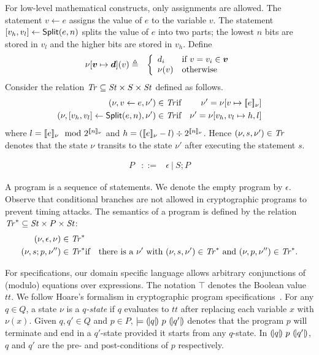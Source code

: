 For low-level mathematical constructs, only assignments are allowed.
The statement $v \leftarrow e$ assigns the value of $e$
to the variable $v$. The statement ${[}{v_h}, {v_l}{]} \leftarrow
\mbox{\textsf{Split}}(e, n)$ splits the value of $e$ into two parts;
the lowest $n$ bits are stored in $v_l$ and the higher bits
are stored in $v_h$. Define
\begin{eqnarray*}
\nu[\vv \mapsto \vd](v) & \defn &
\left\{
   \begin{array}{ll}
     d_i & \textmd{if $v = v_i \in \vv$}\\
     \nu(v) & \textmd{otherwise}
   \end{array}
\right.
\end{eqnarray*}
Consider the relation $\mathit{Tr} \subseteq \mathit{St} \times S \times \mathit{St}$ defined
as follows. 
\begin{eqnarray*}
  (\nu, v \leftarrow e, \nu') \in \mathit{Tr} & \textmd{if} &
  \nu' = \nu[v \mapsto [\![{e}]\!]_{\nu}]\\
  (\nu, {[}{v_h}, {v_l}{]} \leftarrow \mbox{\textsf{Split}} (e, n), \nu') \in
  \mathit{Tr} & \textmd{if} &
  \nu' = \nu[v_h, v_l \mapsto h, l]
\end{eqnarray*}
where
$l = [\![{e}]\!]_{\nu} \mod 2^{[\![{n}]\!]_{\nu}}$ and
$h = ([\![{e}]\!]_{\nu} - l) \div 2^{[\![{n}]\!]_{\nu}}$.
Hence $(\nu, s, \nu') \in \mathit{Tr}$ denotes that the state $\nu$ transits to 
the state $\nu'$ after executing the statement $s$.

\begin{eqnarray*}
  P & ::= & \epsilon \ |\ S; P
\end{eqnarray*}

A program is a sequence of statements. We denote the empty program by
$\epsilon$. Observe that conditional branches are not allowed in
cryptographic programs to prevent timing attacks. The semantics of a
program is defined by the relation 
$\mathit{Tr}^* \subseteq \mathit{St} \times P \times \mathit{St}$:
\begin{eqnarray*}
  (\nu, \epsilon, \nu) \in \mathit{Tr}^*\\
  (\nu, s; p, \nu'') \in \mathit{Tr}^* & \textmd{if} &
    \textmd{there is a } \nu' \textmd{ with }
    (\nu, s, \nu') \in \mathit{Tr}^* \textmd{ and }
    (\nu, p, \nu'') \in \mathit{Tr}^*.
\end{eqnarray*}

For specifications, our domain specific language allows arbitrary
conjunctions of (modulo) equations over expressions. The notation
$\top$ denotes the Boolean value $\mathit{tt}$. We follow Hoare's
formalism in cryptographic program specifications~\cite{H:69:ABCP}. 
For any $q \in Q$, a state $\nu$ is a \emph{$q$-state} if 
$q$ evaluates to $\mathit{tt}$ after replacing each variable $x$ with
$\nu (x)$. Given $q, q' \in Q$ and $p \in P$, $\models
{(\!|}{q}{|\!)}~{p}~{(\!|}{q'}{|\!)}$ 
denotes that the program $p$ will terminate and end in a $q'$-state
provided it starts from any $q$-state. In ${(\!|}{q}{|\!)}~{p}~{(\!|}{q'}{|\!)}$,
$q$ and $q'$ are the pre- and post-conditions of $p$ respectively.

